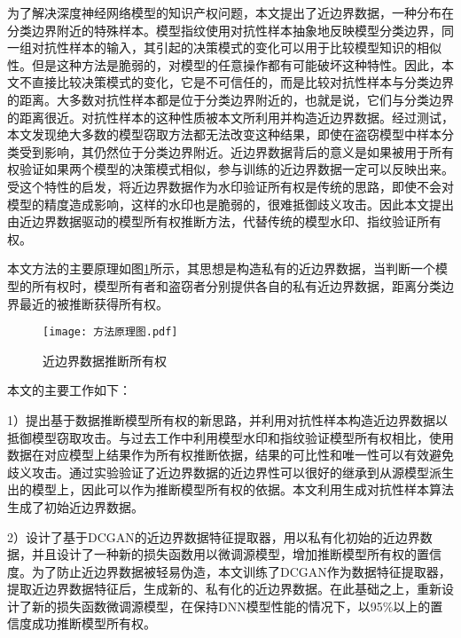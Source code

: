 为了解决深度神经网络模型的知识产权问题，本文提出了近边界数据，一种分布在分类边界附近的特殊样本。模型指纹\cite{cao2021ipguard}使用对抗性样本抽象地反映模型分类边界，同一组对抗性样本的输入，其引起的决策模式的变化可以用于比较模型知识的相似性。但是这种方法是脆弱的，对模型的任意操作都有可能破坏这种特性。因此，本文不直接比较决策模式的变化，它是不可信任的，而是比较对抗性样本与分类边界的距离。大多数对抗性样本都是位于分类边界附近的，也就是说，它们与分类边界的距离很近。对抗性样本的这种性质被本文所利用并构造近边界数据。经过测试，本文发现绝大多数的模型窃取方法都无法改变这种结果，即使在盗窃模型中样本分类受到影响，其仍然位于分类边界附近。近边界数据背后的意义是如果被用于所有权验证如果两个模型的决策模式相似，参与训练的近边界数据一定可以反映出来。受这个特性的启发，将近边界数据作为水印验证所有权是传统的思路，即使不会对模型的精度造成影响，这样的水印也是脆弱的，很难抵御歧义攻击。因此本文提出由近边界数据驱动的模型所有权推断方法，代替传统的模型水印、指纹验证所有权。

本文方法的主要原理如图\ref{方法原理图}所示，其思想是构造私有的近边界数据，当判断一个模型的所有权时，模型所有者和盗窃者分别提供各自的私有近边界数据，距离分类边界最近的被推断获得所有权。

\begin{figure}[htb]%
	\centering
	\setlength{\abovecaptionskip}{5mm} %
	\texttt{[image: 方法原理图.pdf]}
	\caption{近边界数据推断所有权}
	\label{方法原理图}
	\end {figure}

本文的主要工作如下：

1）提出基于数据推断模型所有权的新思路，并利用对抗性样本构造近边界数据以抵御模型窃取攻击。与过去工作中利用模型水印和指纹验证模型所有权相比，使用数据在对应模型上结果作为所有权推断依据，结果的可比性和唯一性可以有效避免歧义攻击。通过实验验证了近边界数据的近边界性可以很好的继承到从源模型派生出的模型上，因此可以作为推断模型所有权的依据。本文利用生成对抗性样本算法生成了初始近边界数据。

2）设计了基于DCGAN的近边界数据特征提取器，用以私有化初始的近边界数据，并且设计了一种新的损失函数用以微调源模型，增加推断模型所有权的置信度。为了防止近边界数据被轻易伪造，本文训练了DCGAN作为数据特征提取器，提取近边界数据特征后，生成新的、私有化的近边界数据。在此基础之上，重新设计了新的损失函数微调源模型，在保持DNN模型性能的情况下，以95\%以上的置信度成功推断模型所有权。

